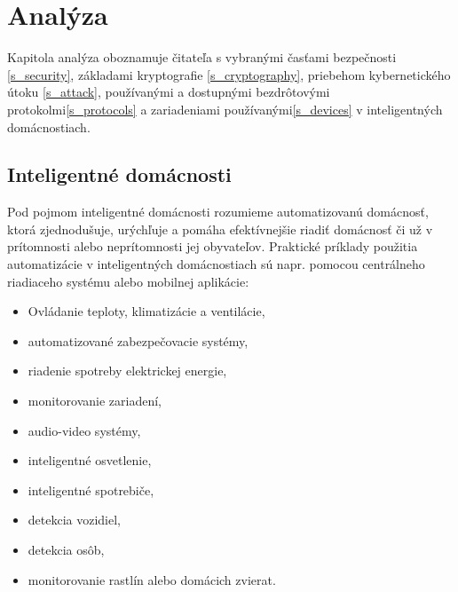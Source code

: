 \documentclass[12pt,a4wide,oneside,openright]{report}
\begin{document}



\chapter{Analýza} \label{s_analyza}
Kapitola analýza oboznamuje čitateľa s vybranými časťami bezpečnosti \ref{s_security}, základami kryptografie \ref{s_cryptography}, priebehom kybernetického útoku \ref{s_attack}, používanými a dostupnými bezdrôtovými protokolmi\ref{s_protocols} a zariadeniami používanými\ref{s_devices} v inteligentných domácnostiach.

\section{Inteligentné domácnosti} \label{s_inteligent_house}
Pod pojmom inteligentné domácnosti rozumieme automatizovanú domácnosť, ktorá zjednodušuje, urýchľuje a pomáha efektívnejšie riadiť domácnosť či už v prítomnosti alebo neprítomnosti jej obyvateľov.
Praktické príklady použitia automatizácie v inteligentných domácnostiach sú napr. pomocou centrálneho riadiaceho systému alebo mobilnej aplikácie: \cite{cleverism}
\begin{itemize}
	\item Ovládanie teploty, klimatizácie a ventilácie,
	\item automatizované zabezpečovacie systémy,
	\item riadenie spotreby elektrickej energie,
	\item monitorovanie zariadení,
	\item audio-video systémy,
	\item inteligentné osvetlenie,
	\item inteligentné spotrebiče,
	\item detekcia vozidiel,
	\item detekcia osôb,
	\item monitorovanie rastlín alebo domácich zvierat.
\end{itemize}
\onehalfspacing
\end{document}
